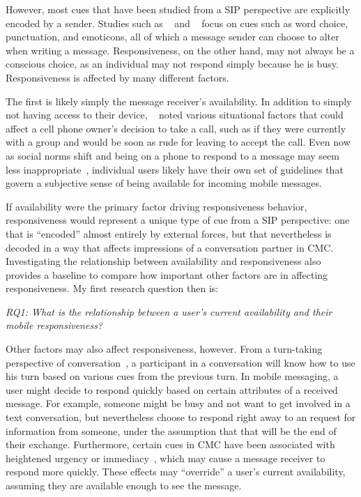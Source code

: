 \documentclass[12pt]{nuthesis}	%
\begin{document}
However, most cues that have been studied from a SIP perspective are explicitly encoded by a sender. Studies such as ~\citet{hancock2007expressing} and ~\citet{pirzadeh2012expression} focus on cues such as word choice, punctuation, and emoticons, all of which a message sender can choose to alter when writing a message. Responsiveness, on the other hand, may not always be a conscious choice, as an individual may not respond simply because he is busy. Responsiveness is affected by many different factors.

The first is likely simply the message receiver's availability. In addition to simply not having access to their device, ~\citet{avrahami2007improving} noted various situational factors that could affect a cell phone owner's decision to take a call, such as if they were currently with a group and would be soon as rude for leaving to accept the call. Even now as social norms shift and being on a phone to respond to a message may seem less inappropriate~\citep{rainie2015americans}, individual users likely have their own set of guidelines that govern a subjective sense of being available for incoming mobile messages.

If availability were the primary factor driving responsiveness behavior, responsiveness would represent a unique type of cue from a SIP perspective: one that is ``encoded'' almost entirely by external forces, but that nevertheless is decoded in a way that affects impressions of a conversation partner in CMC. Investigating the relationship between availability and responsiveness also provides a baseline to compare how important other factors are in affecting responsiveness. My first research question then is:

\textit{RQ1: What is the relationship between a user's current availability and their mobile responsiveness?}

Other factors may also affect responsiveness, however. From a turn-taking perspective of conversation~\citep{sacks1974simplest}, a participant in a conversation will know how to use his turn based on various cues from the previous turn. In mobile messaging, a user might decide to respond quickly based on certain attributes of a received message. For example, someone might be busy and not want to get involved in a text conversation, but nevertheless choose to respond right away to an request for information from someone, under the assumption that that will be the end of their exchange. Furthermore, certain cues in CMC have been associated with heightened urgency or immediacy~\citep{nguyen2014lexical}, which may cause a message receiver to respond more quickly. These effects may ``override'' a user's current availability, assuming they are available enough to see the message.
\end{document}
